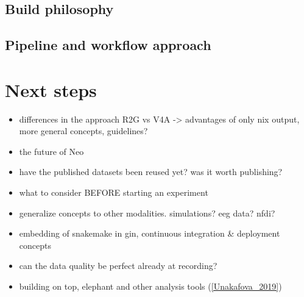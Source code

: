 \subsection{Build philosophy}

\subsection{Pipeline and workflow approach}
\subsection{}

\section{Next steps} 


\begin{itemize}
 \item differences in the approach R2G vs V4A -> advantages of only nix output, more general concepts, guidelines?
 \item the future of Neo
 \item have the published datasets been reused yet? was it worth publishing?
 \item what to consider BEFORE starting an experiment
 \item generalize concepts to other modalities. simulations? eeg data? nfdi?
 \item embedding of snakemake in gin, continuous integration \& deployment concepts
 \item can the data quality be perfect already at recording?
 \item building on top, elephant and other analysis tools (\cref{Unakafova_2019})
\end{itemize}



% 
% 
% 

